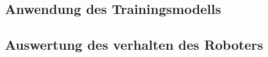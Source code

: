 \documentclass[conference]{IEEEtran}
\begin{document}
	\subsection{Anwendung des Trainingsmodells } %
	\subsection {Auswertung des verhalten des Roboters}	%
	

	
\end{document}
